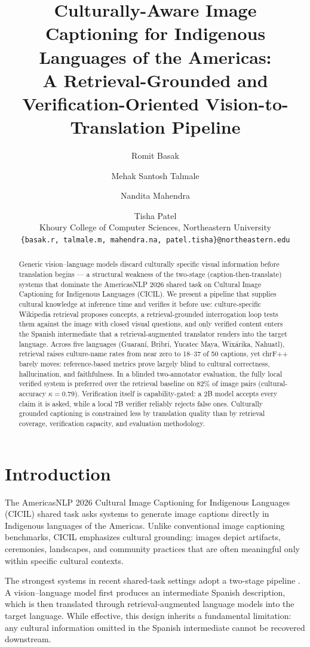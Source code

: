 \documentclass[11pt]{article}
\title{Culturally-Aware Image Captioning for Indigenous Languages of the Americas:\\
A Retrieval-Grounded and Verification-Oriented Vision-to-Translation Pipeline}
\author{Romit Basak \and Mehak Santosh Talmale \and Nandita Mahendra \and Tisha Patel \\
  Khoury College of Computer Sciences, Northeastern University \\
  \texttt{\{basak.r, talmale.m, mahendra.na, patel.tisha\}@northeastern.edu}}
\begin{document}
\maketitle

\begin{abstract}
Generic vision--language models discard culturally specific visual
information before translation begins --- a structural weakness of the
two-stage (caption-then-translate) systems that dominate the AmericasNLP
2026 shared task on Cultural Image Captioning for Indigenous Languages
(CICIL). We present a pipeline that supplies cultural knowledge at
inference time and verifies it before use: culture-specific Wikipedia
retrieval proposes concepts, a retrieval-grounded interrogation loop tests
them against the image with closed visual questions, and only verified
content enters the Spanish intermediate that a retrieval-augmented
translator renders into the target language. Across five languages
(Guaraní, Bribri, Yucatec Maya, Wixárika, Nahuatl), retrieval raises
culture-name rates from near zero to 18--37 of 50 captions, yet chrF++
barely moves: reference-based metrics prove largely blind to cultural
correctness, hallucination, and faithfulness. In a blinded two-annotator
evaluation, the fully local verified system is preferred over the retrieval
baseline on 82\% of image pairs (cultural-accuracy $\kappa=0.79$).
Verification itself is capability-gated: a 2B model accepts every claim it
is asked, while a local 7B verifier reliably rejects false ones. Culturally
grounded captioning is constrained less by translation quality than by
retrieval coverage, verification capacity, and evaluation methodology.
\end{abstract}

\section{Introduction}
The AmericasNLP 2026 Cultural Image Captioning for Indigenous Languages
(CICIL) shared task \citep{bui2026cicil} asks systems to generate image
captions directly in Indigenous languages of the Americas. Unlike
conventional image captioning benchmarks, CICIL emphasizes cultural
grounding: images depict artifacts, ceremonies, landscapes, and community
practices that are often meaningful only within specific cultural contexts.

The strongest systems in recent shared-task settings adopt a two-stage
pipeline \citep{dhawan2026gators}. A vision--language model first produces an
intermediate Spanish description, which is then translated through
retrieval-augmented language models into the target language. While
effective, this design inherits a fundamental limitation: any cultural
information omitted in the Spanish intermediate cannot be recovered
downstream.
\end{document}
